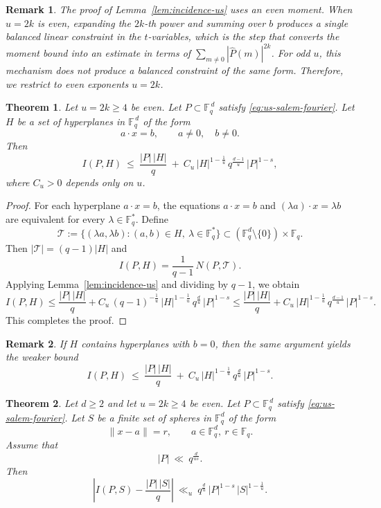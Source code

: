 \documentclass{article}
\newtheorem{theorem}{Theorem}[section]
\newtheorem{remark}{Remark}[section]
\begin{document}
\begin{remark}\label{rem:parity}
The proof of Lemma~\ref{lem:incidence-us} uses an even moment.
When $u=2k$ is even, expanding the $2k$-th power and summing over $b$ produces a single balanced linear constraint in the $t$-variables, which is the step that converts the moment bound into an estimate in terms of $\sum\limits_{m\ne 0}|\widehat{P}(m)|^{2k}$.
For odd $u$, this mechanism does not produce a balanced constraint of the same form.
Therefore, we restrict to even exponents $u=2k$.
\end{remark}

\begin{theorem}\label{thm:us-theorem41}
Let $u=2k\ge 4$ be even.
Let $P\subset\mathbb{F}_q^{\,d}$ satisfy \eqref{eq:us-salem-fourier}.
Let $H$ be a set of hyperplanes in $\mathbb{F}_q^{\,d}$ of the form
\[
a\cdot x=b,
\qquad a\ne 0,\quad b\ne 0.
\]
Then
\[
I(P,H)
\ \le\
\frac{|P|\,|H|}{q}
\ +\
C_u\,|H|^{1-\frac1u}\,q^{\frac{d-1}{u}}\,|P|^{1-s},
\]
where $C_u>0$ depends only on $u$.
\end{theorem}

\begin{proof}
For each hyperplane $a\cdot x=b$, the equations
$a\cdot x=b$ and $(\lambda a)\cdot x=\lambda b$ are equivalent for every $\lambda\in\mathbb{F}_q^\ast$.
Define
\[
\mathcal{T}
:=
\{(\lambda a,\lambda b): (a,b)\in H,\ \lambda\in\mathbb{F}_q^\ast\}
\subset (\mathbb{F}_q^d\setminus\{0\})\times\mathbb{F}_q.
\]
Then $|\mathcal{T}|=(q-1)|H|$ and
\[
I(P,H)=\frac{1}{q-1}\,N(P,\mathcal{T}).
\]
Applying Lemma~\ref{lem:incidence-us} and dividing by $q-1$, we obtain
\[
I(P,H)
\le
\frac{|P|\,|H|}{q}
+
C_u\,(q-1)^{-\frac1u}\,|H|^{1-\frac1u}\,q^{\frac{d}{u}}\,|P|^{1-s}
\le
\frac{|P|\,|H|}{q}
+
C_u\,|H|^{1-\frac1u}\,q^{\frac{d-1}{u}}\,|P|^{1-s}.
\]
This completes the proof.
\end{proof}

\begin{remark}\label{rem:us-bzero}
If $H$ contains hyperplanes with $b=0$, then the same argument yields the weaker bound
\[
I(P,H)
\ \le\
\frac{|P|\,|H|}{q}
\ +\
C_u\,|H|^{1-\frac1u}\,q^{\frac{d}{u}}\,|P|^{1-s}.
\]
\end{remark}

\begin{theorem}\label{thm:us-spheres}
Let $d\ge 2$ and let $u=2k\ge 4$ be even.
Let $P\subset \mathbb{F}_q^{\,d}$ satisfy \eqref{eq:us-salem-fourier}.
Let $S$ be a finite set of spheres in $\mathbb{F}_q^d$ of the form
\[
\|x-a\|=r,
\qquad a\in\mathbb{F}_q^d,\ r\in\mathbb{F}_q.
\]
Assume that
\[
|P|\ \ll\ q^{\frac{d}{us}}.
\]
Then
\[
\left| I(P,S)-\frac{|P|\,|S|}{q}\right|
\ \ll_u\
q^{\frac{d}{u}}\,|P|^{1-s}\,|S|^{1-\frac1u}.
\]
\end{theorem}
\end{document}

